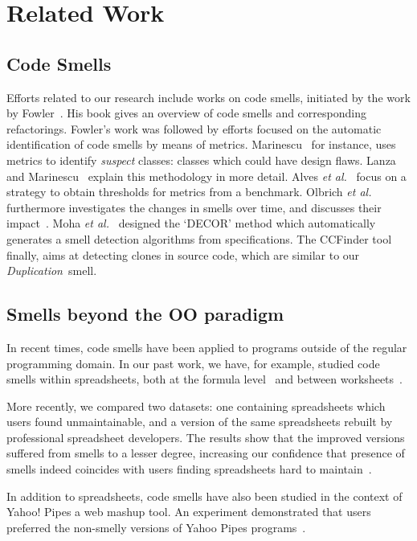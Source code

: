 \documentclass{sig-alternate}
\newcommand{\dup}{\emph{Duplication}~}
\begin{document}
\section{Related Work}
\label{sec:related}

\subsection{Code Smells}
Efforts related to our research include works on code smells, initiated by the work by Fowler~\cite{fowler_refactoring:_1999}. His book gives an overview of code smells and corresponding refactorings. Fowler's work was followed by efforts focused on the automatic identification of code smells by means of metrics. Marinescu~\cite{marinescu_detecting_2001} for instance, uses metrics to identify \emph{suspect} classes: classes which could have design flaws. Lanza and Marinescu~\cite{lanza_object-oriented_2006} explain this methodology in more detail. Alves \emph{et al.}~\cite{alves_deriving_2010} focus on a strategy to obtain thresholds for metrics from a benchmark. Olbrich \emph{et al.} furthermore investigates the changes in smells over time, and discusses their impact~\cite{olbrich_evolution_2009}. Moha \emph{et al.}~\cite{moha_decor:_2010} designed the `DECOR' method which automatically generates a smell detection algorithms from specifications. The CCFinder tool~\cite{kamiya_ccfinder:_2002} finally, aims at detecting clones in source code, which are similar to our \dup smell.

\subsection{Smells beyond the OO paradigm}
In recent times, code smells have been applied to programs outside of the regular programming domain. In our past work, we have, for example, studied code smells within spreadsheets, both at the formula level~\cite{hermans_detecting_2014} and between worksheets~\cite{hermans_detecting_2012}.

More recently, we compared two datasets: one containing spreadsheets which users found unmaintainable, and a version of the same spreadsheets rebuilt by professional spreadsheet developers. The results show that the improved versions suffered from smells to a lesser degree, increasing our confidence that presence of smells indeed coincides with users finding spreadsheets hard to maintain~\cite{jansen_code_2015}.

In addition to spreadsheets, code smells have also been studied in the context of Yahoo! Pipes a web mashup tool. An experiment demonstrated that users preferred the non-smelly versions of Yahoo Pipes programs~\cite{stolee_refactoring_2011}. 
\end{document}
